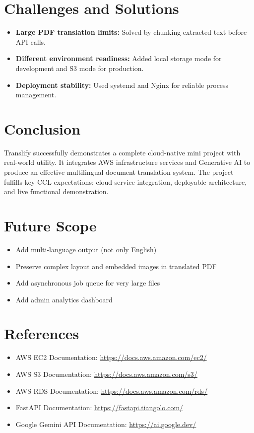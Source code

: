 \documentclass[12pt]{article}
\begin{document}
\section{Challenges and Solutions}
\begin{itemize}[leftmargin=*]
    \item \textbf{Large PDF translation limits:} Solved by chunking extracted text before API calls.
    \item \textbf{Different environment readiness:} Added local storage mode for development and S3 mode for production.
    \item \textbf{Deployment stability:} Used systemd and Nginx for reliable process management.
\end{itemize}

\section{Conclusion}
Translify successfully demonstrates a complete cloud-native mini project with real-world utility. It integrates AWS infrastructure services and Generative AI to produce an effective multilingual document translation system. The project fulfills key CCL expectations: cloud service integration, deployable architecture, and live functional demonstration.

\section{Future Scope}
\begin{itemize}[leftmargin=*]
    \item Add multi-language output (not only English)
    \item Preserve complex layout and embedded images in translated PDF
    \item Add asynchronous job queue for very large files
    \item Add admin analytics dashboard
\end{itemize}

\section{References}
\begin{itemize}[leftmargin=*]
    \item AWS EC2 Documentation: \url{https://docs.aws.amazon.com/ec2/}
    \item AWS S3 Documentation: \url{https://docs.aws.amazon.com/s3/}
    \item AWS RDS Documentation: \url{https://docs.aws.amazon.com/rds/}
    \item FastAPI Documentation: \url{https://fastapi.tiangolo.com/}
    \item Google Gemini API Documentation: \url{https://ai.google.dev/}
\end{itemize}
\end{document}
